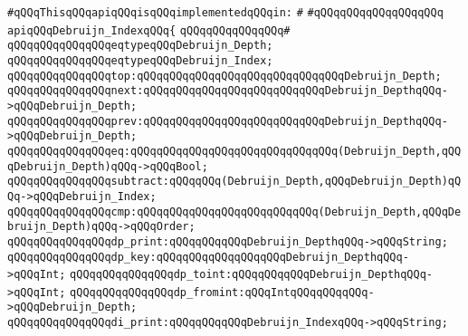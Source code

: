 \newline
\newline
\newline
\newline
\newline
\newline
\verb|#qQQqThisqQQqapiqQQqisqQQqimplementedqQQqin:|\newline
\verb|#|\newline
\verb|#qQQqqQQqqQQqqQQqqQQq|\newline
\newline
\verb|apiqQQqDebruijn_IndexqQQq{|\newline
\verb|qQQqqQQqqQQqqQQq#|\newline
\verb|qQQqqQQqqQQqqQQqeqtypeqQQqDebruijn_Depth;|\newline
\verb|qQQqqQQqqQQqqQQqeqtypeqQQqDebruijn_Index;|\newline
\newline
\verb|qQQqqQQqqQQqqQQqtop:qQQqqQQqqQQqqQQqqQQqqQQqqQQqqQQqDebruijn_Depth;|\newline
\verb|qQQqqQQqqQQqqQQqnext:qQQqqQQqqQQqqQQqqQQqqQQqqQQqDebruijn_DepthqQQq->qQQqDebruijn_Depth;|\newline
\verb|qQQqqQQqqQQqqQQqprev:qQQqqQQqqQQqqQQqqQQqqQQqqQQqDebruijn_DepthqQQq->qQQqDebruijn_Depth;|\newline
\verb|qQQqqQQqqQQqqQQqeq:qQQqqQQqqQQqqQQqqQQqqQQqqQQqqQQq(Debruijn_Depth,qQQqDebruijn_Depth)qQQq->qQQqBool;|\newline
\verb|qQQqqQQqqQQqqQQqsubtract:qQQqqQQq(Debruijn_Depth,qQQqDebruijn_Depth)qQQq->qQQqDebruijn_Index;|\newline
\verb|qQQqqQQqqQQqqQQqcmp:qQQqqQQqqQQqqQQqqQQqqQQqqQQq(Debruijn_Depth,qQQqDebruijn_Depth)qQQq->qQQqOrder;|\newline
\newline
\verb|qQQqqQQqqQQqqQQqdp_print:qQQqqQQqqQQqDebruijn_DepthqQQq->qQQqString;|\newline
\verb|qQQqqQQqqQQqqQQqdp_key:qQQqqQQqqQQqqQQqqQQqDebruijn_DepthqQQq->qQQqInt;|\newline
\verb|qQQqqQQqqQQqqQQqdp_toint:qQQqqQQqqQQqDebruijn_DepthqQQq->qQQqInt;|\newline
\verb|qQQqqQQqqQQqqQQqdp_fromint:qQQqIntqQQqqQQqqQQq->qQQqDebruijn_Depth;|\newline
\newline
\verb|qQQqqQQqqQQqqQQqdi_print:qQQqqQQqqQQqDebruijn_IndexqQQq->qQQqString;|\newline
